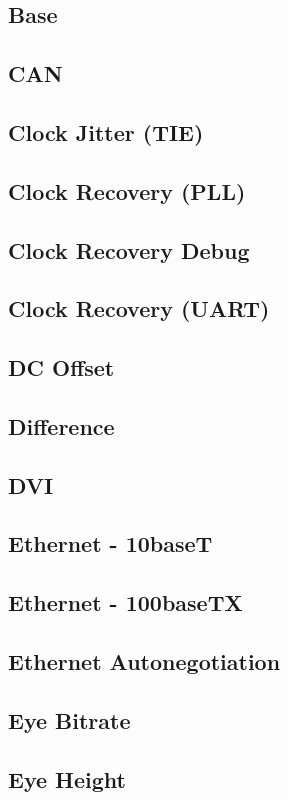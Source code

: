 \documentclass[11pt]{article}
\begin{document}
\subsection{Base}
\subsection{CAN}
\subsection{Clock Jitter (TIE)}
\subsection{Clock Recovery (PLL)}
\label{filter:cdrpll}

\subsection{Clock Recovery Debug}
\subsection{Clock Recovery (UART)}
\subsection{DC Offset}
\subsection{Difference}
\subsection{DVI}
\label{filter:dvi}

\subsection{Ethernet - 10baseT}
\subsection{Ethernet - 100baseTX}
\subsection{Ethernet Autonegotiation}
\subsection{Eye Bitrate}
\subsection{Eye Height}
\end{document}
